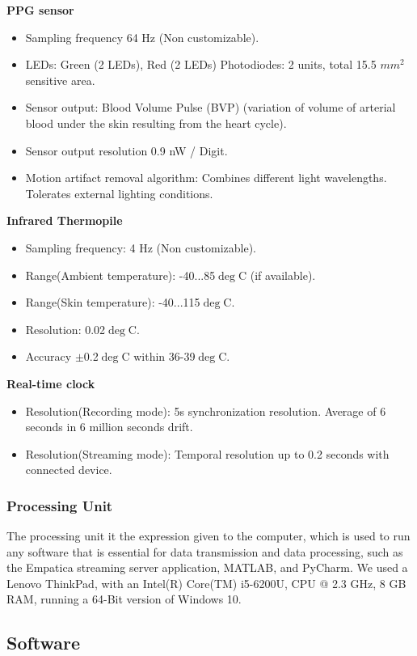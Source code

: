 \textbf{PPG sensor}
\begin{itemize}
\item Sampling frequency 64 Hz (Non customizable).
\item LEDs: Green (2 LEDs), Red (2 LEDs) Photodiodes: 2
units, total 15.5 $mm^{2}$ sensitive area.
\item Sensor output: Blood Volume Pulse (BVP) (variation
of volume of arterial blood under the skin resulting
from the heart cycle).
\item Sensor output resolution 0.9 nW / Digit.
\item Motion artifact removal algorithm: Combines different light wavelengths. Tolerates external lighting conditions.
\end{itemize}

\textbf{Infrared Thermopile}
\begin{itemize}
\item Sampling frequency: 4 Hz (Non customizable).
\item Range(Ambient temperature): -40...85$\deg$C (if available).
\item Range(Skin temperature): -40...115$\deg$C.
\item Resolution: 0.02$\deg$C.
\item Accuracy $\pm$0.2$\deg$C within 36-39$\deg$C.
\end{itemize}

\textbf{Real-time clock}
\begin{itemize}
\item Resolution(Recording mode): 5s synchronization resolution. Average of 6 seconds in 6 million seconds drift.
\item Resolution(Streaming mode): Temporal resolution up to 0.2 seconds with connected device.
\end{itemize}
\subsubsection{Processing Unit}
The processing unit it the expression given to the computer, which is used to run any software that is essential for data transmission and data processing, such as the Empatica streaming server application, MATLAB, and PyCharm. We used a Lenovo ThinkPad, with an Intel(R) Core(TM) i5-6200U, CPU @ 2.3 GHz, 8 GB RAM, running a 64-Bit version of Windows 10. 
\subsection{Software}
